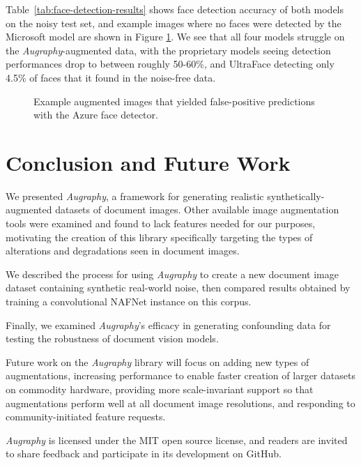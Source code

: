 \documentclass[runningheads]{llncs}
\begin{document}
Table~\ref{tab:face-detection-results} shows face detection accuracy of both models on the noisy test set, and example images where no faces were detected by the Microsoft model are shown in Figure \ref{fig:face-detection-mistakes}.
We see that all four models struggle on the \emph{Augraphy}-augmented data, with the proprietary models seeing detection performances drop to between roughly 50-60\%, and UltraFace detecting only 4.5\% of faces that it found in the noise-free data.

\begin{figure}
    \centering{}
    \caption{Example augmented images that yielded false-positive predictions with the Azure face detector.}
    \label{fig:face-detection-mistakes}
\end{figure}


\section{Conclusion and Future Work}
We presented \emph{Augraphy}, a framework for generating realistic synthetically-augmented datasets of document images.
Other available image augmentation tools were examined and found to lack features needed for our purposes, motivating the creation of this library specifically targeting the types of alterations and degradations seen in document images.

We described the process for using \emph{Augraphy} to create a new document image dataset containing synthetic real-world noise, then compared results obtained by training a convolutional NAFNet instance on this corpus.

Finally, we examined \emph{Augraphy}'s efficacy in generating confounding data for testing the robustness of document vision models.

Future work on the \emph{Augraphy} library will focus on adding new types of augmentations, increasing performance to enable faster creation of larger datasets on commodity hardware, providing more scale-invariant support so that augmentations perform well at all document image resolutions, and responding to community-initiated feature requests.

\emph{Augraphy} is licensed under the MIT open source license, and readers are invited to share feedback and participate in its development on GitHub.


%
%
%


\end{document}
